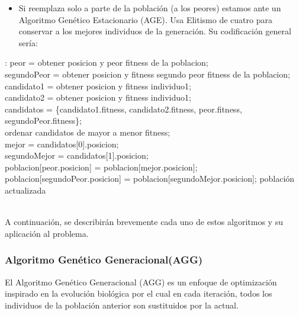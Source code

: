 \begin{itemize}
\item Si reemplaza solo a parte de la población (a los peores) estamos ante un Algoritmo Genético Estacionario (AGE).  Usa Elitismo de cuatro para conservar a los mejores individuos de la generación. Su codificación general sería:
\end{itemize}
\begin{algorithm}[H]
	
	
	\BlankLine
	:
	\BlankLine
	peor = obtener posicion y peor fitness de la poblacion;\\
	segundoPeor = obtener posicion y fitness segundo peor fitness de la poblacion;\\
	candidato1 = obtener posicion y fitness individuo1;\\
	candidato2 = obtener posicion y fitness individuo1;\\
	\BlankLine
	candidatos = \{candidato1.fitness, candidato2.fitness, peor.fitness, segundoPeor.fitness\};\\
	ordenar candidatos de mayor a menor fitness;\\
	\BlankLine
	mejor = candidatos[0].posicion;\\
	segundoMejor = candidatos[1].posicion; \\
	\BlankLine
	poblacion[peor.posicion] = poblacion[mejor.posicion];\\
	poblacion[segundoPeor.posicion] = poblacion[segundoMejor.posicion]; 
	\BlankLine
	\Return población actualizada\;
\end{algorithm}
\quad \\
A continuación, se describirán brevemente cada uno de estos algoritmos y su aplicación al problema.

\subsubsection{Algoritmo Genético Generacional(AGG)}
	El Algoritmo Genético Generacional (AGG) es un enfoque de optimización inspirado en la evolución biológica por el cual en cada iteración, todos los individuos de la población anterior son sustituidos por la actual.\\
	
